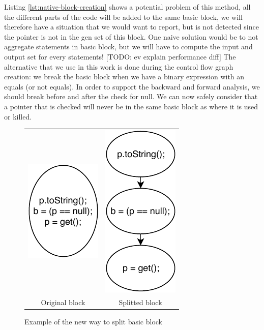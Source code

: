 Listing \ref{lst:native-block-creation} shows a potential problem of this method, all the different parts of the code will be added to the same basic block, we will therefore have a situation that we would want to report, but is not detected since the pointer is not in the gen set of this block. 
One naive solution would be to not aggregate statements in basic block, but we will have to compute the input and output set for every statements! [TODO: ev explain performance diff]
The alternative that we use in this work is done during the control flow graph creation: we break the basic block when we have a binary expression with an equals (or not equals). 
In order to support the backward and forward analysis, we should break before and after the check for null. 
We can now safely consider that a pointer that is checked will never be in the same basic block as where it is used or killed.
\begin{figure}[h]
\caption{Example of the new way to split basic block}
\label{figure:new-way-to-split}
\setlength{\tabcolsep}{24pt}
	\begin{tabular}{cc}
		\includegraphics[]{figure/original-block-cfg.pdf}  &
		\includegraphics[]{figure/splitted-block-cfg.pdf}   \\ 
		Original block & Splitted block
	\end{tabular}
\end{figure}

